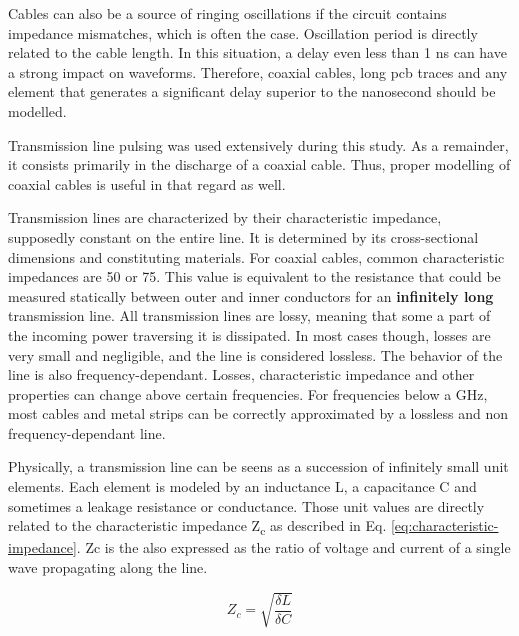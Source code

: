 Cables can also be a source of ringing oscillations if the circuit contains impedance mismatches, which is often the case.
Oscillation period is directly related to the cable length.
In this situation, a delay even less than 1 ns can have a strong impact on waveforms.
Therefore, coaxial cables, long \gls{pcb} traces and any element that generates a significant delay superior to the nanosecond should be modelled.

Transmission line pulsing was used extensively during this study.
As a remainder, it consists primarily in the discharge of a coaxial cable.
Thus, proper modelling of coaxial cables is useful in that regard as well.

Transmission lines are characterized by their characteristic impedance, supposedly constant on the entire line.
It is determined by its cross-sectional dimensions and constituting materials.
For coaxial cables, common characteristic impedances are 50\textOmega{} or 75\textOmega{}.
This value is equivalent to the resistance that could be measured statically between outer and inner conductors for an \textbf{infinitely long} transmission line.
All transmission lines are lossy, meaning that some a part of the incoming power traversing it is dissipated.
In most cases though, losses are very small and negligible, and the line is considered lossless.
The behavior of the line is also frequency-dependant.
Losses, characteristic impedance and other properties can change above certain frequencies.
For frequencies below a GHz, most cables and metal strips can be correctly approximated by a lossless and non frequency-dependant line.

Physically, a transmission line can be seens as a succession of infinitely small unit elements.
Each element is modeled by an inductance \textdelta{}L, a capacitance \textdelta{}C and sometimes a leakage resistance or conductance.
Those unit values are directly related to the characteristic impedance Z\textsubscript{c} as described in Eq. \ref{eq:characteristic-impedance}.
\gls{Zc} is the also expressed as the ratio of voltage and current of a single wave propagating along the line.

\begin{equation}
Z_{c} = \sqrt{\frac{\delta L}{\delta C}}
\label{eq:characteristic-impedance}
\end{equation}

